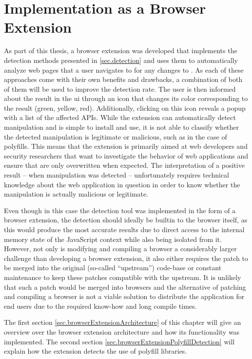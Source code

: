 \chapter{Implementation as a Browser Extension}
\label{sec.browserExtension}

As part of this thesis, a browser extension was developed that implements the detection methods presented in \autoref{sec.detection} and uses them to automatically analyze web pages that a user navigates to for any changes to \browserAPIs{}. As each of these approaches come with their own benefits and drawbacks, a combination of both of them will be used to improve the detection rate. The user is then informed about the result in the \ac{ui} through an icon that changes its color corresponding to the result (green, yellow, red). Additionally, clicking on this icon reveals a popup with a list of the affected APIs. While the extension can automatically detect \browserAPI{} manipulation and is simple to install and use, it is not able to classify whether the detected manipulation is legitimate or malicious, such as in the case of polyfills. This means that the extension is primarily aimed at web developers and security researchers that want to investigate the behavior of web applications and ensure that \browserAPIs{} are only overwritten when expected. The interpretation of a positive result – when manipulation was detected – unfortunately requires technical knowledge about the web application in question in order to know whether the manipulation is actually malicious or legitimate.

Even though in this case the detection tool was implemented in the form of a browser extension, the detection should ideally be builtin to the browser itself, as this would produce the most accurate results due to direct access to the internal memory state of the JavaScript context while also being isolated from it. However, not only is modifying and compiling a browser a considerably larger challenge than developing a browser extension, it also either requires the patch to be merged into the original (so-called “upstream”) code-base or constant maintenance to keep these patches compatible with the upstream. It is unlikely that such a patch would be merged into browsers and the alternative of patching and compiling a browser is not a viable solution to distribute the application for end users due to the required know-how and long compile times.

The first section \ref{sec.browserExtensionArchitecture} of this chapter will give an overview over the browser extension architecture and how its functionality was implemented. The second section \ref{sec.browserExtensionPolyfillDetection} will explain how the extension detects the use of polyfill libraries.

